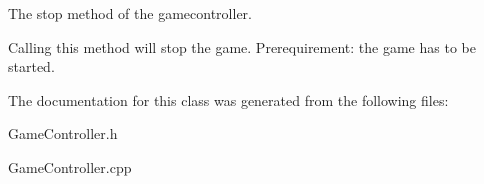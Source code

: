 The stop method of the gamecontroller. 

Calling this method will stop the game. Prerequirement\+: the game has to be started. 

The documentation for this class was generated from the following files\+:\begin{DoxyCompactItemize}
\item 
Game\+Controller.\+h\item 
Game\+Controller.\+cpp\end{DoxyCompactItemize}
